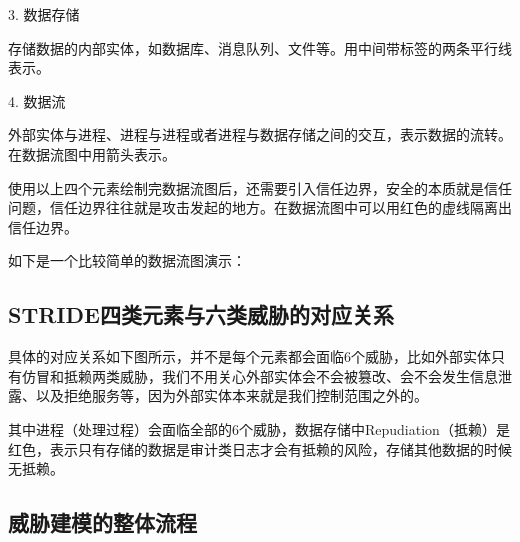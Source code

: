 3.  数据存储

存储数据的内部实体，如数据库、消息队列、文件等。用中间带标签的两条平行线表示。

4.  数据流

外部实体与进程、进程与进程或者进程与数据存储之间的交互，表示数据的流转。在数据流图中用箭头表示。

使用以上四个元素绘制完数据流图后，还需要引入信任边界，安全的本质就是信任问题，信任边界往往就是攻击发起的地方。在数据流图中可以用红色的虚线隔离出信任边界。

如下是一个比较简单的数据流图演示：

\subsection[]{STRIDE四类元素与六类威胁的对应关系}

具体的对应关系如下图所示，并不是每个元素都会面临6个威胁，比如外部实体只有仿冒和抵赖两类威胁，我们不用关心外部实体会不会被篡改、会不会发生信息泄露、以及拒绝服务等，因为外部实体本来就是我们控制范围之外的。

其中进程（处理过程）会面临全部的6个威胁，数据存储中Repudiation（抵赖）是红色，表示只有存储的数据是审计类日志才会有抵赖的风险，存储其他数据的时候无抵赖。

\subsection[]{威胁建模的整体流程}



